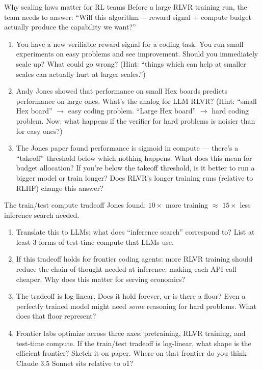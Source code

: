\begin{thinkfirst}{Why scaling laws matter for RL teams}
Before a large RLVR training run, the team needs to answer: ``Will this algorithm + reward signal + compute budget actually produce the capability we want?''

\begin{enumerate}
  \item You have a new verifiable reward signal for a coding task. You run small experiments on easy problems and see improvement. Should you immediately scale up? What could go wrong? (Hint: ``things which can help at smaller scales can actually hurt at larger scales.'')

  \item Andy Jones showed that performance on small Hex boards predicts performance on large ones. What's the analog for LLM RLVR? (Hint: ``small Hex board'' $\to$ easy coding problem. ``Large Hex board'' $\to$ hard coding problem. Now: what happens if the verifier for hard problems is noisier than for easy ones?)

  \item The Jones paper found performance is sigmoid in compute --- there's a ``takeoff'' threshold below which nothing happens. What does this mean for budget allocation? If you're below the takeoff threshold, is it better to run a bigger model or train longer? Does RLVR's longer training runs (relative to RLHF) change this answer?
\end{enumerate}
\end{thinkfirst}

\begin{thinkfirst}{The train/test compute tradeoff}
Jones found: $10\times$ more training $\approx$ $15\times$ less inference search needed.

\begin{enumerate}
  \item Translate this to LLMs: what does ``inference search'' correspond to? List at least 3 forms of test-time compute that LLMs use.

  \item If this tradeoff holds for frontier coding agents: more RLVR training should reduce the chain-of-thought needed at inference, making each API call cheaper. Why does this matter for serving economics?

  \item The tradeoff is log-linear. Does it hold forever, or is there a floor? Even a perfectly trained model might need \textit{some} reasoning for hard problems. What does that floor represent?

  \item Frontier labs optimize across three axes: pretraining, RLVR training, and test-time compute. If the train/test tradeoff is log-linear, what shape is the efficient frontier? Sketch it on paper. Where on that frontier do you think Claude 3.5 Sonnet sits relative to o1?
\end{enumerate}
\end{thinkfirst}

